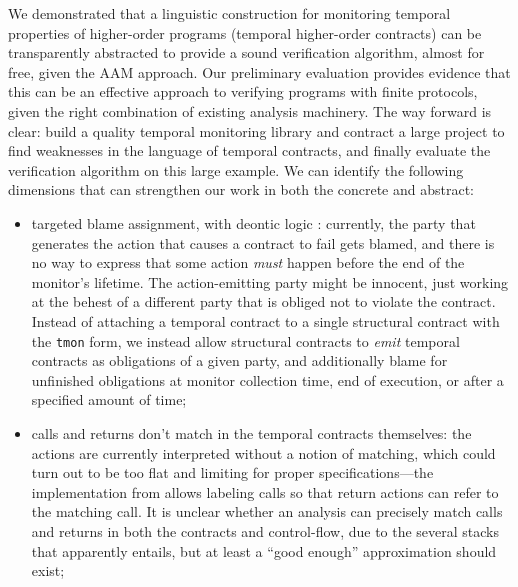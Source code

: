 We demonstrated that a linguistic construction for monitoring temporal properties of higher-order programs (temporal higher-order contracts) can be transparently abstracted to provide a sound verification algorithm, almost for free, given the AAM approach.
%
Our preliminary evaluation provides evidence that this can be an effective approach to verifying programs with finite protocols, given the right combination of existing analysis machinery.
%
The way forward is clear: build a quality temporal monitoring library and contract a large project to find weaknesses in the language of temporal contracts, and finally evaluate the verification algorithm on this large example.
%
We can identify the following dimensions that can strengthen our work in both the concrete and abstract:
\begin{itemize}
\item{targeted blame assignment, with deontic logic \citep{ianjohnson:DBLP:conf/dagstuhl/MeyerWD98}:
%
currently, the party that generates the action that causes a contract to fail gets blamed, and there is no way to express that some action \emph{must} happen before the end of the monitor's lifetime.
%
The action-emitting party might be innocent, just working at the behest of a different party that is obliged not to violate the contract.
%
Instead of attaching a temporal contract to a single structural contract with the {\tt tmon} form, we instead allow structural contracts to \emph{emit} temporal contracts as obligations of a given party, and additionally blame for unfinished obligations at monitor collection time, end of execution, or after a specified amount of time;
}
%
\item{calls and returns don't match in the temporal contracts themselves:
%
the actions are currently interpreted without a notion of matching, which could turn out to be too flat and limiting for proper specifications---the implementation from \dfm{} allows labeling calls so that return actions can refer to the matching call.
%
It is unclear whether an analysis can precisely match calls and returns in both the contracts and control-flow, due to the several stacks that apparently entails, but at least a ``good enough'' approximation should exist;
}
%
\end{itemize}
